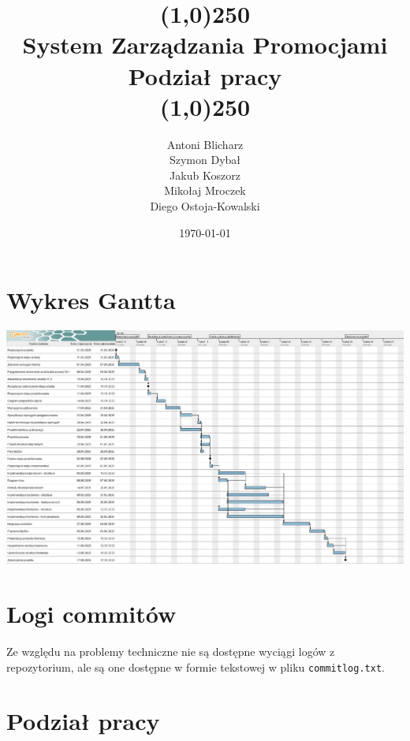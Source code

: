 \documentclass[a4paper,12pt]{article}
\title{
    \line(1,0){250}\\
    System Zarządzania Promocjami\\
    Podział pracy\\
    \line(1,0){250}}
\author{Antoni Blicharz\\
        Szymon Dybał\\
        Jakub Koszorz\\
        Mikołaj Mroczek\\
        Diego Ostoja-Kowalski\\}
\date{\today}
\begin{document}
\begin{titlepage}
    \maketitle
\end{titlepage}

\newpage

\section{Wykres Gantta}

\includegraphics[width=\textwidth]{images/Gantt.png}

\section{Logi commitów}

Ze względu na problemy techniczne nie są dostępne wyciągi logów z repozytorium, ale są one dostępne w formie tekstowej w pliku \texttt{commit\textunderscore{}log.txt}.

\section{Podział pracy}
\end{document}
